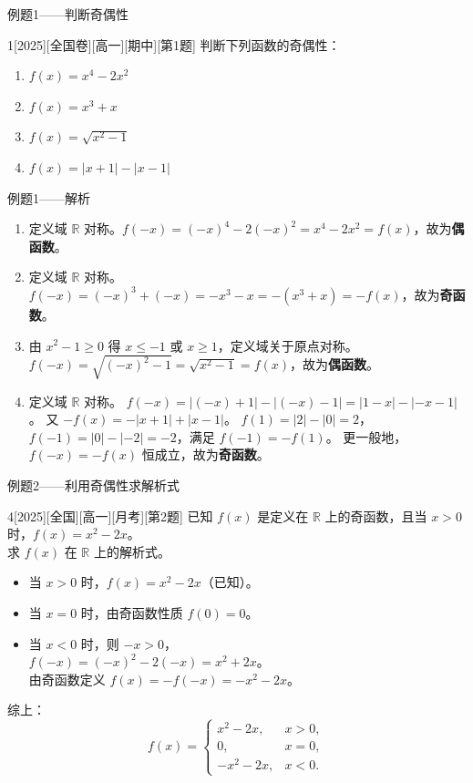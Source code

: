 \documentclass[aspectratio=169,11pt]{ctexbeamer}
\newenvironment{solutions}{%
	\par\medskip
	\noindent{\color{ProofRed}\bfseries【解析】：}
	\par\vspace{0.3em}
}{%
	\par\medskip
}
\begin{document}
	\begin{frame}{例题1——判断奇偶性}
		\begin{example}{1}[2025][全国卷][高一][期中][第1题]
			判断下列函数的奇偶性：
			\begin{enumerate}
				\item $f(x)=x^4-2x^2$
				\item $f(x)=x^3+x$
				\item $f(x)=\sqrt{x^2-1}$
				\item $f(x)=|x+1|-|x-1|$
			\end{enumerate}
		\end{example}
	\end{frame}
	
	\begin{frame}{例题1——解析}
	\begin{solutions}
		\begin{enumerate}
			\item 定义域 $\mathbb{R}$ 对称。$f(-x)=(-x)^4-2(-x)^2=x^4-2x^2=f(x)$，故为\textbf{偶函数}。
			\item 定义域 $\mathbb{R}$ 对称。$f(-x)=(-x)^3+(-x)=-x^3-x=-(x^3+x)=-f(x)$，故为\textbf{奇函数}。
			\item 由 $x^2-1\ge0$ 得 $x\le-1$ 或 $x\ge1$，定义域关于原点对称。
			$f(-x)=\sqrt{(-x)^2-1}=\sqrt{x^2-1}=f(x)$，故为\textbf{偶函数}。
			\item 定义域 $\mathbb{R}$ 对称。
			$f(-x)=|(-x)+1|-|(-x)-1|=|1-x|-|-x-1|$。
			又 $-f(x)=-|x+1|+|x-1|$。
			$f(1)=|2|-|0|=2$，$f(-1)=|0|-|-2|=-2$，满足 $f(-1)=-f(1)$。
			更一般地，$f(-x)=-f(x)$ 恒成立，故为\textbf{奇函数}。
		\end{enumerate}
	\end{solutions}
	\end{frame}
	
	\begin{frame}[allowframebreaks]{例题2——利用奇偶性求解析式}
		\begin{example}{4}[2025][全国][高一][月考][第2题]
			已知 $f(x)$ 是定义在 $\mathbb{R}$ 上的奇函数，且当 $x>0$ 时，$f(x)=x^2-2x$。\\
			求 $f(x)$ 在 $\mathbb{R}$ 上的解析式。
		\end{example}
		\begin{solutions}
			\begin{itemize}
				\item 当 $x>0$ 时，$f(x)=x^2-2x$（已知）。
				\item 当 $x=0$ 时，由奇函数性质 $f(0)=0$。
				\item 当 $x<0$ 时，则 $-x>0$，\\
				$f(-x)=(-x)^2-2(-x)=x^2+2x$。\\
				由奇函数定义 $f(x)=-f(-x)=-x^2-2x$。
			\end{itemize}
			综上：
			\[
			f(x)=\begin{cases}
				x^2-2x, & x>0,\\[2pt]
				0, & x=0,\\[2pt]
				-x^2-2x, & x<0.
			\end{cases}
			\]
		\end{solutions}
	\end{frame}
	
\end{document}
